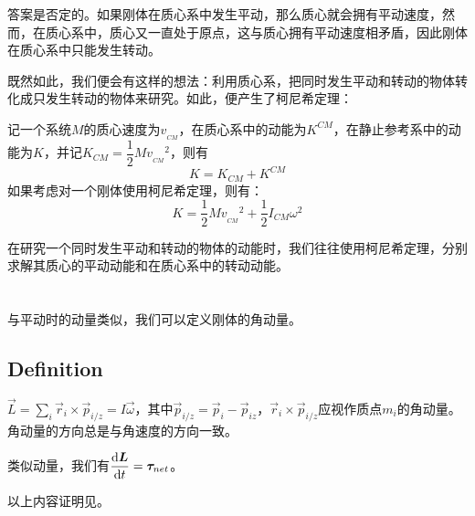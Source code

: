 答案是否定的。如果刚体在质心系中发生平动，那么质心就会拥有平动速度，然而，在质心系中，质心又一直处于原点，这与质心拥有平动速度相矛盾，因此刚体在质心系中只能发生转动。

既然如此，我们便会有这样的想法：利用质心系，把同时发生平动和转动的物体转化成只发生转动的物体来研究。如此，便产生了柯尼希定理：
\begin{law}
	记一个系统$M$的质心速度为$v_{_{CM}}$，在质心系中的动能为$K^{CM}$，在静止参考系中的动能为$K$，并记$K_{CM}=\dfrac{1}{2}Mv_{_{CM}}{}^2$，则有
	\[K=K_{CM}+K^{CM}\]
	如果考虑对一个刚体使用柯尼希定理，则有：
	\[K=\dfrac{1}{2}Mv_{_{CM}}{}^2+\dfrac{1}{2}I_{CM}\omega^2\]
\end{law}

在研究一个同时发生平动和转动的物体的动能时，我们往往使用柯尼希定理，分别求解其质心的平动动能和在质心系中的转动动能。
\section[角动量]{}
与平动时的动量类似，我们可以定义刚体的角动量。
\subsection[定义]{Definition}
\begin{Itemize}
	\item {} $\displaystyle\vec{L}=\sum_i\vec{r}_i\times\vec{p}_{i/z}=I\vec{\omega}$，其中$\vec{p}_{i/z}=\vec{p}_i-\vec{p}_{iz}$，$ \vec{r}_i\times\vec{p}_{i/z}$应视作质点$m_i$的角动量。角动量的方向总是与角速度的方向一致\footnotemark。
	\item 类似动量，我们有$\dfrac{\dif \vec{L}}{\dif t}=\vec{\tau}_{net}$。
\end{Itemize}
以上内容证明见。

